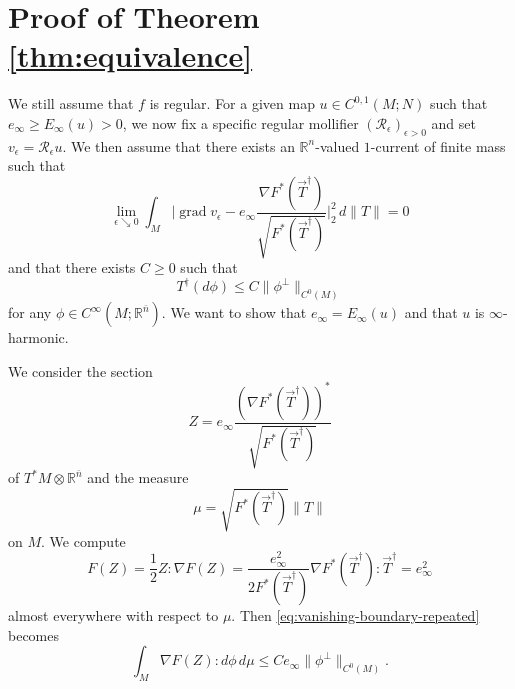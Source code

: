 \documentclass[10pt,a4paper]{amsart}
\newcommand{\R}{\mathbb{R}}
\newcommand{\ndim}{{\bar{n}}}
\DeclareMathOperator{\grad}{grad}
\begin{document}
\section{Proof of Theorem \ref{thm:equivalence}} \label{sct:equivalence}

We still assume that $f$ is regular.
For a given map $u \in C^{0, 1}(M; N)$ such that $e_\infty \ge E_\infty(u) > 0$, we now fix a specific regular mollifier $(\mathcal{R}_\epsilon)_{\epsilon >0}$ and
set $v_\epsilon = \mathcal{R}_\epsilon u$. We then assume that there exists an $\R^n$-valued $1$-current of finite mass such that
\begin{equation} \label{eq:convergence-gradient}
\lim_{\epsilon \searrow 0} \int_M \biggl|\grad v_\epsilon - e_\infty \frac{\nabla F^*(\vec{T}^\dagger)}{\sqrt{F^*(\vec{T}^\dagger)}}\biggr|_2^2 \, d\|T\| = 0
\end{equation}
and that there exists $C \ge 0$ such that
\begin{equation} \label{eq:vanishing-boundary-repeated}
T^\dagger(d\phi) \le C \|\phi^\perp\|_{C^0(M)}
\end{equation}
for any $\phi \in C^\infty(M; \R^\ndim)$. We want to show that $e_\infty = E_\infty(u)$ and that
$u$ is $\infty$-harmonic.

We consider the section
\[
Z = e_\infty \frac{(\nabla F^*(\vec{T}^\dagger))^*}{\sqrt{F^*(\vec{T}^\dagger)}}
\]
of $T^*M \otimes \R^\ndim$ and the measure
\[
\mu = \sqrt{F^*(\vec{T}^\dagger)} \|T\|
\]
on $M$. We compute
\[
F(Z) = \frac{1}{2} Z : \nabla F(Z) = \frac{e_\infty^2}{2 F^*(\vec{T}^\dagger)} \nabla F^*(\vec{T}^\dagger) : \vec{T}^\dagger = e_\infty^2
\]
almost everywhere with respect to $\mu$. Then \eqref{eq:vanishing-boundary-repeated} becomes
\[
\int_M \nabla F(Z) : d\phi \, d\mu \le Ce_\infty \|\phi^\perp\|_{C^0(M)}.
\]
\end{document}
